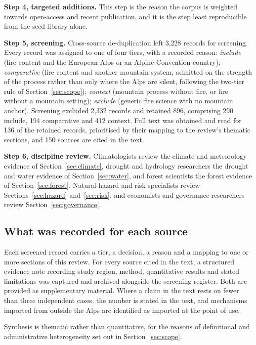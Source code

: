\documentclass[11pt,a4paper]{article}
\begin{document}
\textbf{Step 4, targeted additions.} This step is the reason the corpus is weighted towards open-access and recent publication, and it is the step least reproducible from the seed library alone.

\textbf{Step 5, screening.} Cross-source de-duplication left 3{,}228 records for screening. Every record was assigned to one of four tiers, with a recorded reason: \emph{include} (fire content and the European Alps or an Alpine Convention country); \emph{comparative} (fire content and another mountain system, admitted on the strength of the process rather than only where the Alps are silent, following the two-tier rule of Section~\ref{sec:scope}); \emph{context} (mountain process without fire, or fire without a mountain setting); \emph{exclude} (generic fire science with no mountain anchor). Screening excluded 2{,}332 records and retained 896, comprising 290 include, 194 comparative and 412 context. Full text was obtained and read for 136 of the retained records, prioritised by their mapping to the review's thematic sections, and 150 sources are cited in the text.

\textbf{Step 6, discipline review.} Climatologists review the climate and meteorology evidence of Section~\ref{sec:climate}, drought and hydrology researchers the drought and water evidence of Section~\ref{sec:water}, and forest scientists the forest evidence of Section~\ref{sec:forest}. Natural-hazard and risk specialists review Sections~\ref{sec:hazard} and~\ref{sec:risk}, and economists and governance researchers review Section~\ref{sec:governance}.

\subsection{What was recorded for each source}

Each screened record carries a tier, a decision, a reason and a mapping to one or more sections of this review. For every source cited in the text, a structured evidence note recording study region, method, quantitative results and stated limitations was captured and archived alongside the screening register. Both are provided as supplementary material. Where a claim in the text rests on fewer than three independent cases, the number is stated in the text, and mechanisms imported from outside the Alps are identified as imported at the point of use.

Synthesis is thematic rather than quantitative, for the reasons of definitional and administrative heterogeneity set out in Section~\ref{sec:scope}.
\end{document}
